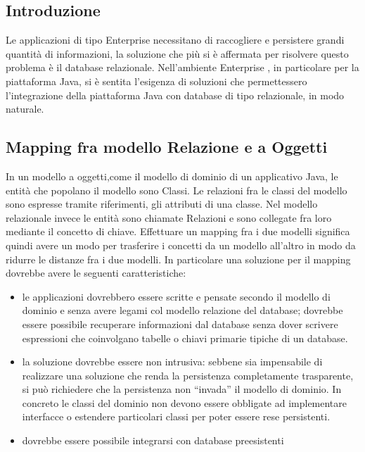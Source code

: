 \subsection{Introduzione}
Le applicazioni di tipo Enterprise necessitano di raccogliere e persistere grandi quantità di informazioni, la soluzione che più si è affermata per risolvere questo problema è il database relazionale. Nell'ambiente Enterprise
, in particolare per la piattaforma Java, si è sentita l'esigenza di soluzioni che permettessero l'integrazione della piattaforma Java con database di tipo relazionale, in modo naturale. 

\subsection{Mapping fra modello Relazione e a Oggetti}
In un modello a oggetti,come il modello di dominio di un applicativo Java, le entità che popolano il modello sono Classi. Le relazioni fra le classi del modello sono espresse tramite riferimenti, gli attributi di una classe.
Nel modello relazionale invece le entità sono chiamate Relazioni e sono collegate fra loro mediante il concetto di chiave. Effettuare un mapping fra i due modelli significa quindi avere un modo per trasferire i concetti da un modello
all'altro in modo da ridurre le distanze fra i due modelli. In particolare una soluzione per il mapping dovrebbe avere le seguenti caratteristiche:

\begin{itemize}
 \item le applicazioni dovrebbero essere scritte e pensate secondo il modello di dominio e senza avere legami col modello relazione del database; dovrebbe essere possibile recuperare informazioni dal database senza dover scrivere espressioni
 che coinvolgano tabelle o chiavi primarie tipiche di un database.
 \item la soluzione dovrebbe essere non intrusiva: sebbene sia impensabile di realizzare una soluzione che renda la persistenza completamente trasparente, si può richiedere che la persistenza non ``invada'' il modello di dominio.
  In concreto le classi del dominio non devono essere obbligate ad implementare interfacce o estendere particolari classi per poter essere rese persistenti.
  \item dovrebbe essere possibile integrarsi con database preesistenti
\end{itemize}


